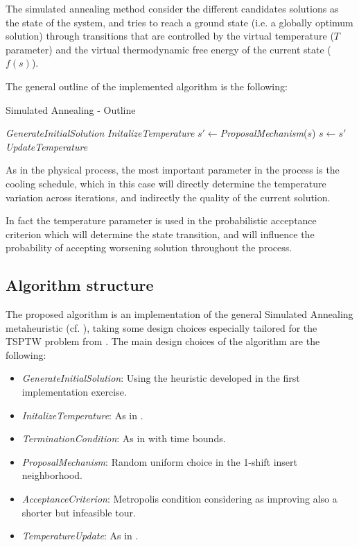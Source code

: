 \begin{homeworkProblem}
The simulated annealing method consider the different candidates solutions as the state of the system, and tries to reach a ground state (i.e. a globally optimum solution) through transitions that are controlled by the virtual temperature ($T$ parameter) and the virtual thermodynamic free energy of the current state ($f(s)$).

The general outline of the implemented algorithm is the following: 

\begin{algorithm}[!h]
  \caption{Simulated Annealing - Outline}\label{aco}
  \begin{algorithmic}[1]
    \State \emph{GenerateInitialSolution}
    \State \emph{InitalizeTemperature} 
        \State $s' \gets $\emph{ProposalMechanism}($s$)
          \State $s \gets s'$
        \EndIf
        \State \emph{UpdateTemperature}
    \EndWhile
\end{algorithmic}
\end{algorithm}

As in the physical process, the most important parameter in the process is the cooling schedule, which in this case will  directly determine the temperature variation across iterations, and indirectly the quality of the current solution.

In fact the temperature parameter is used in the probabilistic acceptance criterion which will determine the state transition, and will influence the probability of accepting worsening solution throughout the process.  

\subsection{Algorithm structure} \label{sec:algstrucSA}
The proposed algorithm is an implementation of the general Simulated Annealing metaheuristic (cf. \cite{kirkpatrick1983optimization}), taking some design choices especially tailored for the TSPTW problem from \cite{ohlmann2007compressed}.
The main design choices of the algorithm are the following:
\begin{itemize}
  \item \emph{GenerateInitialSolution}: Using the heuristic developed in the first implementation exercise.
  \item \emph{InitalizeTemperature}: As in \cite{ohlmann2007compressed}.
  \item \emph{TerminationCondition}: As in \cite{ohlmann2007compressed} with time bounds.
  \item \emph{ProposalMechanism}: Random uniform choice in the 1-shift insert neighborhood.
  \item \emph{AcceptanceCriterion}: Metropolis condition considering as improving also a shorter but infeasible tour.
  \item \emph{TemperatureUpdate}: As in \cite{ohlmann2007compressed}.
\end{itemize}


\end{homeworkProblem}

